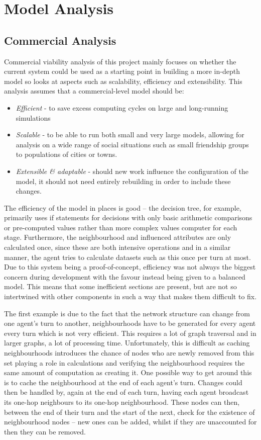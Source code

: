\documentclass[]{report}
\begin{document}
\section{Model Analysis}
\subsection{Commercial Analysis}

Commercial viability analysis of this project mainly focuses on whether the current system could be used as a starting point in building a more in-depth model so looks at aspects such as scalability, efficiency and extensibility. This analysis assumes that a commercial-level model should be:
\begin{itemize}
\item \emph{Efficient} - to save excess computing cycles on large and long-running simulations
\item \emph{Scalable} - to be able to run both small and very large models, allowing for analysis on a wide range of social situations such as small friendship groups to populations of cities or towns.
\item \emph{Extensible \& adaptable} - should new work influence the configuration of the model, it should not need entirely rebuilding in order to include these changes.
\end{itemize}

The efficiency of the model in places is good – the decision tree, for example, primarily uses if statements for decisions with only basic arithmetic comparisons or pre-computed values rather than more complex values computer for each stage. Furthermore, the neighbourhood and influenced attributes are only calculated once, since these are both intensive operations and in a similar manner, the agent tries to calculate datasets such as this once per turn at most.  Due to this system being a proof-of-concept, efficiency was not always the biggest concern during development with the favour instead being given to a balanced model. This means that some inefficient sections are present, but are not so intertwined with other components in such a way that makes them difficult to fix.   

The first example is due to the fact that the network structure can change from one agent's turn to another, neighbourhoods have to be generated for every agent every turn which is not very efficient. This requires a lot of graph traversal and in larger graphs, a lot of processing time. Unfortunately, this is difficult as caching neighbourhoods introduces the chance of nodes who are newly removed from this set playing a role in calculations and verifying the neighbourhood requires the same amount of computation as creating it. One possible way to get around this is to cache the neighbourhood at the end of each agent's turn. Changes could then be handled by, again at the end of each turn, having each agent broadcast its one-hop neighbours to its one-hop neighbourhood. These nodes can then, between the end of their turn and the start of the next, check for the existence of neighbourhood nodes – new ones can be added, whilst if they are unaccounted for then they can be removed.
\end{document}
